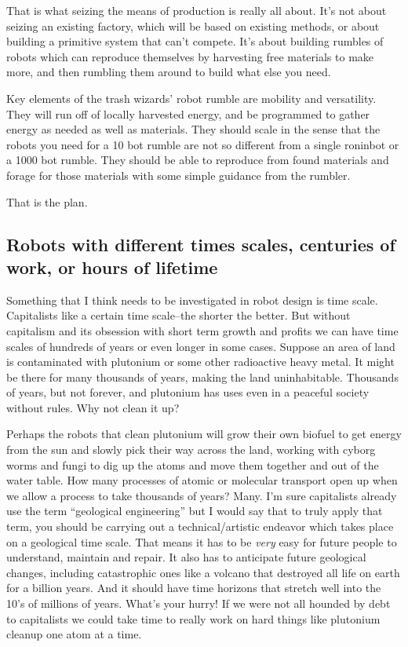 \documentclass[11pt]{article}
\begin{document}
That is what seizing the means of production is really all about. It's
not about seizing an existing factory, which will be based on existing
methods, or about building a primitive system that can't compete. It's
about building rumbles of robots which can reproduce themselves by
harvesting free materials to make more, and then rumbling them around to
build what else you need.

Key elements of the trash wizards' robot rumble are mobility and
versatility. They will run off of locally harvested energy, and be
programmed to gather energy as needed as well as materials. They should
scale in the sense that the robots you need for a 10 bot rumble are not
so different from a single roninbot or a 1000 bot rumble. They should be
able to reproduce from found materials and forage for those materials
with some simple guidance from the rumbler.

That is the plan.

\subsection{Robots with different times scales, centuries of work, or
hours of
lifetime}\label{robots-with-different-times-scales-centuries-of-work-or-hours-of-lifetime}

Something that I think needs to be investigated in robot design is time
scale. Capitalists like a certain time scale--the shorter the better.
But without capitalism and its obsession with short term growth and
profits we can have time scales of hundreds of years or even longer in
some cases. Suppose an area of land is contaminated with plutonium or
some other radioactive heavy metal. It might be there for many thousands
of years, making the land uninhabitable. Thousands of years, but not
forever, and plutonium has uses even in a peaceful society without
rules. Why not clean it up?

Perhaps the robots that clean plutonium will grow their own biofuel to
get energy from the sun and slowly pick their way across the land,
working with cyborg worms and fungi to dig up the atoms and move them
together and out of the water table. How many processes of atomic or
molecular transport open up when we allow a process to take thousands of
years? Many. I'm sure capitalists already use the term ``geological
engineering'' but I would say that to truly apply that term, you should
be carrying out a technical/artistic endeavor which takes place on a
geological time scale. That means it has to be \emph{very} easy for
future people to understand, maintain and repair. It also has to
anticipate future geological changes, including catastrophic ones like a
volcano that destroyed all life on earth for a billion years. And it
should have time horizons that stretch well into the 10's of millions of
years. What's your hurry! If we were not all hounded by debt to
capitalists we could take time to really work on hard things like
plutonium cleanup one atom at a time.
\end{document}
